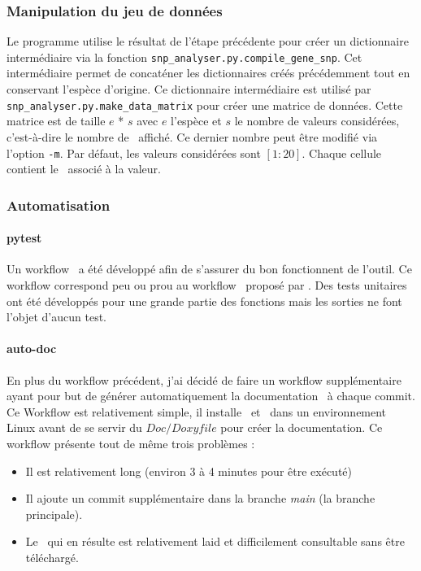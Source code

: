 \documentclass[../main]{subfiles} %
\begin{document}
\subsubsection{Manipulation du jeu de données}
Le programme utilise le résultat de l’étape précédente pour créer un dictionnaire intermédiaire via la fonction \lstinline{snp_analyser.py.compile_gene_snp}. Cet intermédiaire permet de concaténer les dictionnaires créés précédemment tout en conservant l’espèce d’origine.
Ce dictionnaire intermédiaire est utilisé par \lstinline{snp_analyser.py.make_data_matrix} pour créer une matrice de données. Cette matrice est de taille $e$ * $s$  avec $e$ l’espèce et $s$ le nombre de valeurs considérées, c'est-à-dire le nombre de \NbSNP affiché. Ce dernier nombre peut être modifié via l’option \lstinline{-m}. Par défaut, les valeurs considérées sont $[1:20]$. Chaque cellule contient le \GNSPge associé à la valeur.


\subsubsection{Automatisation}

\paragraph{pytest}
\label{sec:SnpPytest}
Un workflow \pytest a été développé afin de s’assurer du bon fonctionnent de l’outil. Ce workflow correspond peu ou prou au workflow \pytest proposé par \GitHub. Des tests unitaires ont été développés pour une grande partie des fonctions mais les sorties ne font l’objet d’aucun test.

\paragraph{auto-doc}
\label{sec:AutoDoc}
En plus du workflow précédent, j’ai décidé de faire un workflow supplémentaire ayant pour but de générer automatiquement la documentation \Doxygen à chaque \gls{commit}. Ce Workflow est relativement simple, il installe \Doxygen et \Latex dans un environnement Linux avant de se servir du $Doc/Doxyfile$ pour créer la documentation. Ce workflow présente tout de même trois problèmes :
\begin{itemize}
\item Il est relativement long (environ 3 à 4 minutes pour être exécuté)
\item Il ajoute un \gls{commit} supplémentaire dans la branche \textit{main} (la branche principale).
\item Le \pdf qui en résulte est relativement laid et difficilement consultable sans être téléchargé.

\end{itemize}
\end{document}
